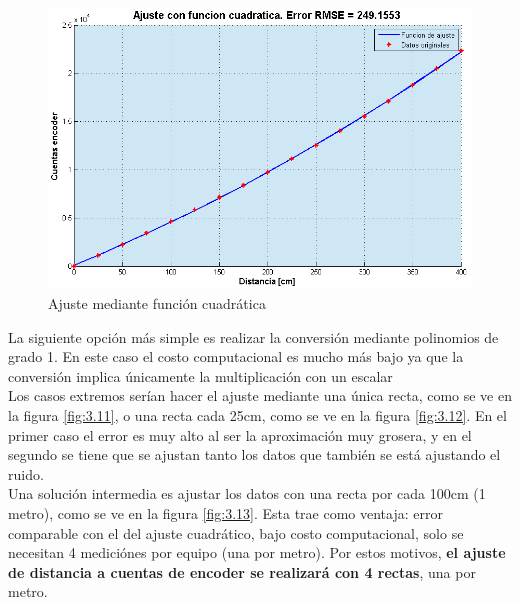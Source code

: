 \begin{figure}[!ht]
	\centering
	\includegraphics[width=15cm,scale=1]{resources/3_10-ajusteCuadratico.png}
	\caption{Ajuste mediante función cuadrática}
	\label{fig:\thefigure}
\end{figure}

La siguiente opción más simple es realizar la conversión mediante polinomios de grado 1. En este caso el costo computacional es mucho más bajo ya que la conversión implica únicamente la multiplicación con un escalar \\
Los casos extremos serían hacer el ajuste mediante una única recta, como se ve en la figura \ref{fig:3.11}, o una recta cada 25cm, como se ve en la figura \ref{fig:3.12}. En el primer caso el error es muy alto al ser la aproximación muy grosera, y en el segundo se tiene que se ajustan tanto los datos que también se está ajustando el ruido. \\

Una solución intermedia es ajustar los datos con una recta por cada 100cm (1 metro), como se ve en la figura \ref{fig:3.13}. Esta trae como ventaja: error comparable con el del ajuste cuadrático, bajo costo computacional, solo se necesitan 4 mediciónes por equipo (una por metro). Por estos motivos, \textbf{el ajuste de distancia a cuentas de encoder se realizará con 4 rectas}, una por metro.


